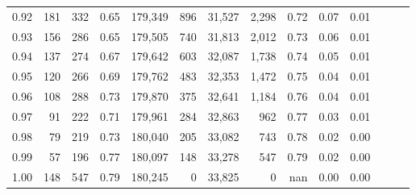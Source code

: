 \begin{tabular}{rrrrrrrrrrrrrr}
0.92 &    181 &  332 &  0.65 &  179,349 &      896 &  31,527 &   2,298 &  0.72 &  0.07 &      0.01 \\
0.93 &    156 &  286 &  0.65 &  179,505 &      740 &  31,813 &   2,012 &  0.73 &  0.06 &      0.01 \\
0.94 &    137 &  274 &  0.67 &  179,642 &      603 &  32,087 &   1,738 &  0.74 &  0.05 &      0.01 \\
0.95 &    120 &  266 &  0.69 &  179,762 &      483 &  32,353 &   1,472 &  0.75 &  0.04 &      0.01 \\
0.96 &    108 &  288 &  0.73 &  179,870 &      375 &  32,641 &   1,184 &  0.76 &  0.04 &      0.01 \\
0.97 &     91 &  222 &  0.71 &  179,961 &      284 &  32,863 &     962 &  0.77 &  0.03 &      0.01 \\
0.98 &     79 &  219 &  0.73 &  180,040 &      205 &  33,082 &     743 &  0.78 &  0.02 &      0.00 \\
0.99 &     57 &  196 &  0.77 &  180,097 &      148 &  33,278 &     547 &  0.79 &  0.02 &      0.00 \\
1.00 &    148 &  547 &  0.79 &  180,245 &        0 &  33,825 &       0 &   nan &  0.00 &      0.00 \\
\bottomrule
\end{tabular}
